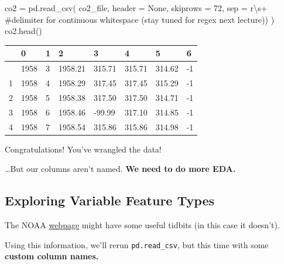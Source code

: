 \documentclass[
  letterpaper,
  DIV=11,
  numbers=noendperiod]{scrreprt}
\newenvironment{Shaded}{\begin{snugshade}}{\end{snugshade}}
\newcommand{\CommentTok}[1]{\textcolor[rgb]{0.37,0.37,0.37}{#1}}
\newcommand{\DecValTok}[1]{\textcolor[rgb]{0.68,0.00,0.00}{#1}}
\newcommand{\NormalTok}[1]{\textcolor[rgb]{0.00,0.23,0.31}{#1}}
\newcommand{\OperatorTok}[1]{\textcolor[rgb]{0.37,0.37,0.37}{#1}}
\newcommand{\VariableTok}[1]{\textcolor[rgb]{0.07,0.07,0.07}{#1}}
\newcommand{\VerbatimStringTok}[1]{\textcolor[rgb]{0.13,0.47,0.30}{#1}}
\begin{document}
\begin{Shaded}
\begin{Highlighting}[]
\NormalTok{co2 }\OperatorTok{=}\NormalTok{ pd.read\_csv(}
\NormalTok{    co2\_file, header }\OperatorTok{=} \VariableTok{None}\NormalTok{, skiprows }\OperatorTok{=} \DecValTok{72}\NormalTok{,}
\NormalTok{    sep }\OperatorTok{=} \VerbatimStringTok{r\textquotesingle{}\textbackslash{}s+\textquotesingle{}}       \CommentTok{\#delimiter for continuous whitespace (stay tuned for regex next lecture))}
\NormalTok{)}
\NormalTok{co2.head()}
\end{Highlighting}
\end{Shaded}

\begin{longtable}[]{@{}llllllll@{}}
\toprule\noalign{}
& 0 & 1 & 2 & 3 & 4 & 5 & 6 \\
\midrule\noalign{}
\endhead
\bottomrule\noalign{}
\endlastfoot
0 & 1958 & 3 & 1958.21 & 315.71 & 315.71 & 314.62 & -1 \\
1 & 1958 & 4 & 1958.29 & 317.45 & 317.45 & 315.29 & -1 \\
2 & 1958 & 5 & 1958.38 & 317.50 & 317.50 & 314.71 & -1 \\
3 & 1958 & 6 & 1958.46 & -99.99 & 317.10 & 314.85 & -1 \\
4 & 1958 & 7 & 1958.54 & 315.86 & 315.86 & 314.98 & -1 \\
\end{longtable}

Congratulations! You've wrangled the data!

\ldots But our columns aren't named. \textbf{We need to do more EDA.}

\subsection{Exploring Variable Feature
Types}\label{exploring-variable-feature-types}

The NOAA \href{https://gml.noaa.gov/ccgg/trends/}{webpage} might have
some useful tidbits (in this case it doesn't).

Using this information, we'll rerun \texttt{pd.read\_csv}, but this time
with some \textbf{custom column names.}
\end{document}
